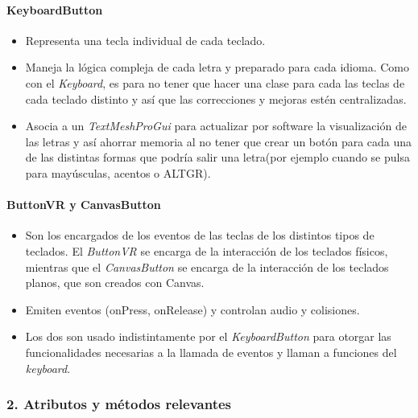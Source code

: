 \paragraph{\qquad KeyboardButton} 
\hfill \break %

\begin{itemize}
	\item Representa una tecla individual de cada teclado.
	\item Maneja la lógica compleja de cada letra y preparado para cada idioma. Como con el \textit{Keyboard}, es para no tener que hacer una clase para cada las teclas de cada teclado distinto y así que las correcciones y mejoras estén centralizadas.
	\item Asocia a un \textit{TextMeshProGui} para actualizar por software la visualización de las letras y así ahorrar memoria al no tener que crear un botón para cada una de las distintas formas que podría salir una letra(por ejemplo cuando se pulsa para mayúsculas, acentos o ALTGR).
	
\end{itemize}

\paragraph{\qquad ButtonVR y CanvasButton} 
\hfill \break %

\begin{itemize}
	\item Son los encargados de los eventos de las teclas de los distintos tipos de teclados. El \textit{ButtonVR} se encarga de la interacción de los teclados físicos, mientras que el \textit{CanvasButton} se encarga de la interacción de los teclados planos, que son creados con Canvas.
	\item Emiten eventos (onPress, onRelease) y controlan audio y colisiones.
	\item Los dos son usado indistintamente por el \textit{KeyboardButton} para otorgar las funcionalidades necesarias a la llamada de eventos y llaman a funciones del \textit{keyboard}.
	
\end{itemize}

\subsubsection{2. Atributos y métodos relevantes}


